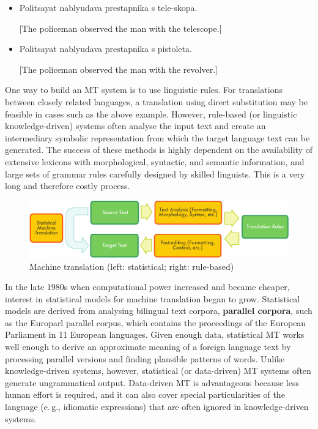 \documentclass[]{../../metanetpaper}
\begin{document}
\begin{multicols}{2}
\begin{itemize}
\item Politsayat nablyudava prestapnika s tele-skopa.
\item[] [The policeman observed the man with the telescope.]
\end{itemize}

\begin{itemize}
\item Politsayat nablyudava prestapnika s pistoleta.
\item[] [The policeman observed the man with the revolver.]
\end{itemize}

One way to build an MT system is to use linguistic rules. For translations between closely related languages, a translation using direct substitution may be feasible in cases such as the above example. However, rule-based (or linguistic knowledge-driven) systems often analyse the input text and create an intermediary symbolic representation from which the target language text can be generated. The success of these methods is highly dependent on the availability of extensive lexicons with morphological, syntactic, and semantic information, and large sets of grammar rules carefully designed by skilled linguists. This is a very long and therefore costly process.

\begin{figure}[htb]
  \center
  \includegraphics[width=\textwidth]{../_media/english/machine_translation}
  \caption{Machine translation (left: statistical; right: rule-based)}
  \label{fig:mtarch_en}
\end{figure}
 
In the late 1980s when computational power increased and became cheaper, interest in statistical models for machine translation began to grow. Statistical models are derived from analysing bilingual text corpora, \textbf{parallel corpora}, such as the Europarl parallel corpus, which contains the proceedings of the European Parliament in 11 European languages. Given enough data, statistical MT works well enough to derive an approximate meaning of a foreign language text by processing parallel versions and finding plausible patterns of words. Unlike knowledge-driven systems, however, statistical (or data-driven) MT systems often generate ungrammatical output. Data-driven MT is advantageous because less human effort is required, and it can also cover special particularities of the language (e.\,g., idiomatic expressions) that are often ignored in knowledge-driven systems. 


\end{multicols}
\end{document}
